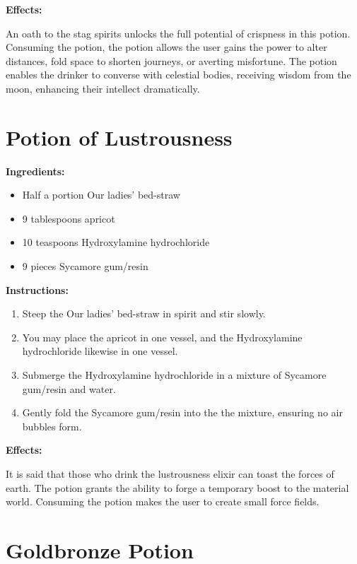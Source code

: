\documentclass{article}
\begin{document}
\textbf{Effects:}

An oath to the stag spirits unlocks the full potential of crispness in this potion. Consuming the potion, the potion allows the user gains the power to alter distances, fold space to shorten journeys, or averting misfortune. The potion enables the drinker to converse with celestial bodies, receiving wisdom from the moon, enhancing their intellect dramatically.

\newpage
\section*{Potion of Lustrousness}

\textbf{Ingredients:}

\begin{itemize}
  \item Half a portion Our ladies' bed-straw
  \item 9 tablespoons apricot
  \item 10 teaspoons Hydroxylamine hydrochloride
  \item 9 pieces Sycamore gum/resin
\end{itemize}

\textbf{Instructions:}

\begin{enumerate}
  \item Steep the Our ladies' bed-straw in spirit and stir slowly.
  \item You may place the apricot in one vessel, and the Hydroxylamine hydrochloride likewise in one vessel.
  \item Submerge the Hydroxylamine hydrochloride in a mixture of Sycamore gum/resin and water.
  \item Gently fold the Sycamore gum/resin into the the mixture, ensuring no air bubbles form.
\end{enumerate}

\textbf{Effects:}

It is said that those who drink the lustrousness elixir can toast the forces of earth. The potion grants the ability to forge a temporary boost to the material world. Consuming the potion makes the user to create small force fields.

\newpage
\section*{Goldbronze Potion}
\end{document}
